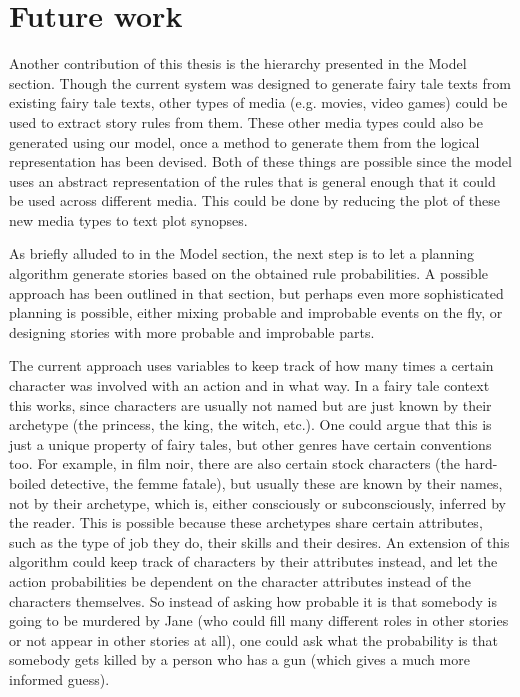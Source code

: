 \section{Future work}

Another contribution of this thesis is the hierarchy presented in the Model
section. Though the current system was designed to generate fairy tale texts
from existing fairy tale texts, other types of media (e.g. movies, video
games) could be used to extract story rules from them.
These other media types could also be generated using our model, once a method
to generate them from the logical representation has been devised. Both of
these things are possible since the model uses an abstract representation of the
rules that is general enough that it could be used across different media.
This could be done by reducing the plot of these new media types to text plot
synopses.

As briefly alluded to in the Model section, the next step is to let a planning
algorithm generate stories based on the obtained rule probabilities. A possible
approach has been outlined in that section, but perhaps even more sophisticated
planning is possible, either mixing probable and improbable events on the fly,
or designing stories with more probable and improbable parts.

The current approach uses variables to keep track of how many times a certain
character was involved with an action and in what way. In a fairy tale context
this works, since characters are usually not named but are just known by their
archetype (the princess, the king, the witch, etc.). One could argue that this
is just a unique property of fairy tales, but other genres have certain conventions
too. For example, in film noir, there are also certain stock characters (the
hard-boiled detective, the femme fatale), but usually these are
known by their names, not by their archetype, which is, either consciously or
subconsciously, inferred by the reader. This is possible because these
archetypes share certain attributes, such as the type of job they do, their
skills and their desires. An extension of this algorithm
could keep track of characters by their attributes instead, and let the action
probabilities be dependent on the character attributes instead of the characters
themselves. So instead of asking how probable it is that somebody is going to be
murdered by Jane (who could fill many different roles in other stories or not
appear in other stories at all), one could ask what the probability is that somebody gets
killed by a person who has a gun (which gives a much more informed guess).

